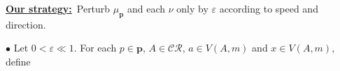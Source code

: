 \documentclass[aspectratio=169, bigfiles]{beamer}
\newcommand{\CR}{\mathcal{CR}}
\newcommand{\eps}{\varepsilon} %
\def\bu{$\bullet$ }
\begin{document}
\begin{frame}
\begin{small}
\vspace{-2mm}
\begin{tcolorbox}[colframe=yellow,
colback=yellow!10!white,
colbacktitle=yellow!40!white,
coltitle=black, fonttitle=\bfseries]
\textbf{\underline{Our strategy:}}\, 
Perturb $\mu_\mathbf{p}$ and each $\nu$ only by $\eps$ according to speed and direction. %
\end{tcolorbox}
\vspace{-1mm}
\bu Let $0<\eps\ll1$.
For each $p\in\mathbf{p}$, $A\in\CR$, $a\in V(A,m)$ and $x\in V(A,m)$, define \vspace{-2mm}


\end{small}
\end{frame}
\end{document}
